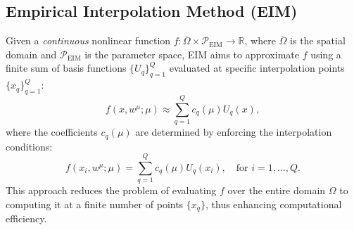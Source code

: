\documentclass[11pt]{article}
\begin{document}
\subsection{Empirical Interpolation Method (EIM)}
Given a \textit{continuous} nonlinear function $f: \overline{\Omega} \times \mathcal{P}_{\text{EIM}} \rightarrow \mathbb{R}$, where $\overline{\Omega}$ is the spatial domain and $\mathcal{P}_{\text{EIM}}$ is the parameter space, EIM aims to approximate $f$ using a finite sum of basis functions $\{ U_q \}_{q=1}^Q$ evaluated at specific interpolation points $\{ x_q \}_{q=1}^Q$:
\[
f(x, w^\mu;\mu) \approx \sum_{q=1}^Q c_q(\mu) U_q(x),
\]
where the coefficients $c_q(\mu)$ are determined by enforcing the interpolation conditions:
\[
f(x_i, w^\mu;  \mu) = \sum_{q=1}^Q c_q(\mu) U_q(x_i), \quad \text{for } i = 1, \ldots, Q.
\]
This approach reduces the problem of evaluating \( f \) over the entire domain \( \Omega \) to computing it at a finite number of points \( \{ x_q \} \), thus enhancing computational efficiency.
\end{document}
